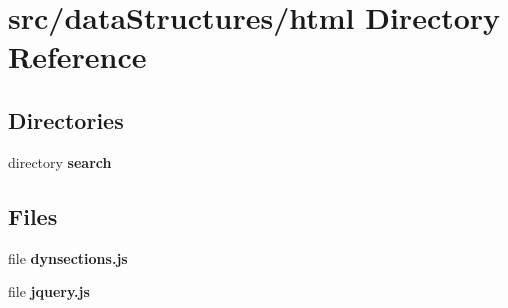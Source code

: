 \section{src/data\-Structures/html Directory Reference}
\label{dir_62ecdd8b8d63ebdc20c883e6ff9720fe}
\subsection*{Directories}
\begin{DoxyCompactItemize}
\item 
directory {\bf search}
\end{DoxyCompactItemize}
\subsection*{Files}
\begin{DoxyCompactItemize}
\item 
file {\bf dynsections.\-js}
\item 
file {\bf jquery.\-js}
\end{DoxyCompactItemize}
